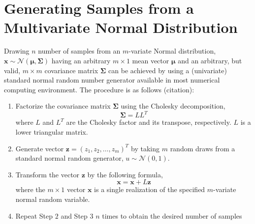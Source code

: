 \section{Generating Samples from a Multivariate Normal Distribution}\label{app:mvn_sampling}

Drawing $n$ number of samples from an $m$-variate Normal distribution, $\boldsymbol{x} \sim \mathcal{N}(\boldsymbol{\mu}, \boldsymbol{\Sigma})$ having an arbitrary $m \times 1$ mean vector $\boldsymbol{\mu}$ and an arbitrary, but valid, $m \times m$ covariance matrix $\boldsymbol{\Sigma}$ can be achieved by using a (univariate) standard normal random number generator available in most numerical computing environment.
The procedure is as follows (citation):

\begin{enumerate}
	\item Factorize the covariance matrix $\boldsymbol{\Sigma}$ using the Cholesky decomposition,
	\begin{equation}
	\boldsymbol{\Sigma} = L L^T
	\end{equation}
	where $L$ and $L^T$ are the Cholesky factor and its transpose, respectively. $L$ is a lower triangular matrix.
	
	\item Generate vector $\mathbf{z}=(z_1, z_2, \dots, z_m)^T$ by taking $m$ random draws from a standard normal random generator, $u \sim \mathcal{N}(0, 1)$.
	
	\item Transform the vector $\mathbf{z}$ by the following formula,
	\begin{equation}
	\mathbf{x} = \boldsymbol{x} + L \boldsymbol{z}
	\end{equation}
	where the $m \times 1$ vector $\mathbf{x}$ is a single realization of the specified $m$-variate normal random variable.
	
	\item Repeat Step $2$ and Step $3$ $n$ times to obtain the desired number of samples 
\end{enumerate}
